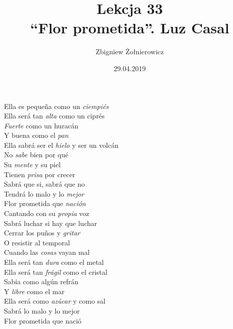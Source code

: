 \documentclass{article}
\begin{document}
    \title{
        {\huge Lekcja 33} \\
        {\large ``Flor prometida''. Luz Casal}
    }
    \author{Zbigniew Żołnierowicz}
    \date{29.04.2019}
    \maketitle
    Ella es peque\~na como un \emph{ciempi\'es} \\
    Ella ser\'a tan \emph{alta} como un cipr\'es \\
    \emph{Fuerte} como un hurac\'an \\
    Y buena como el \emph{pan} \\
    Ella sabr\'a ser el \emph{hielo} y ser un volc\'an \\
    No \emph{sabe} bien por qu\'e \\
    Su \emph{mente} y su piel \\
    Tienen \emph{prisa} por crecer \\
    Sabr\'a que si, sabr\'a que no \\
    Tendr\'a lo malo y lo \emph{mejor} \\
    Flor prometida que \emph{nación} \\
    Cantando con su \emph{propia} voz \\
    Sabr\'a luchar si hay que luchar \\
    Cerrar los pu\~nos y \emph{gritar} \\
    O resistir al temporal \\
    Cuando las \emph{cosas} vayan mal \\
    Ella ser\'a tan \emph{dura} como el metal \\
    Ella ser\'a tan \emph{fr\'agil} como el cristal \\
    Sabia como alg\'un refr\'an \\
    Y \emph{libre} como el mar \\
    Ella ser\'a como \emph{az\'ucar} y como sal \\
    Sabr\'a lo malo y lo mejor \\
    Flor prometida que nació
\end{document}
